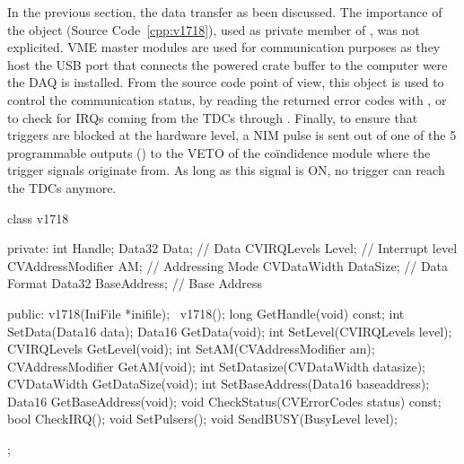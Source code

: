     In the previous section, the data transfer as been discussed. The importance of the  object (Source Code~\ref{cpp:v1718}), used as private member of , was not explicited. VME  master modules are used for communication purposes as they host the USB port that connects the powered crate buffer to the computer were the DAQ is installed. From the source code point of view, this object is used to control the communication status, by reading the returned error codes with , or to check for IRQs coming from the TDCs through . Finally, to ensure that triggers are blocked at the hardware level, a NIM pulse is sent out of one of the 5 programmable outputs () to the VETO of the coïndidence module where the trigger signals originate from. As long as this signal is ON, no trigger can reach the TDCs anymore.\\
	
	\begin{code}
    \begin{cppcode}
class v1718{
    private:
        int               Handle;
        Data32            Data;           // Data
        CVIRQLevels       Level;          // Interrupt level
        CVAddressModifier AM;             // Addressing Mode
        CVDataWidth       DataSize;       // Data Format
        Data32            BaseAddress;    // Base Address

    public:
        v1718(IniFile *inifile);
        ~v1718();
        long              GetHandle(void) const;
        int               SetData(Data16 data);
        Data16            GetData(void);
        int               SetLevel(CVIRQLevels level);
        CVIRQLevels       GetLevel(void);
        int               SetAM(CVAddressModifier am);
        CVAddressModifier GetAM(void);
        int               SetDatasize(CVDataWidth datasize);
        CVDataWidth       GetDataSize(void);
        int               SetBaseAddress(Data16 baseaddress);
        Data16            GetBaseAddress(void);
        void              CheckStatus(CVErrorCodes status) const;
        bool              CheckIRQ();
        void              SetPulsers();
        void              SendBUSY(BusyLevel level);
};
    \end{cppcode}
	\label{cpp:v1718}
	\vspace{5mm}
    \end{code}

